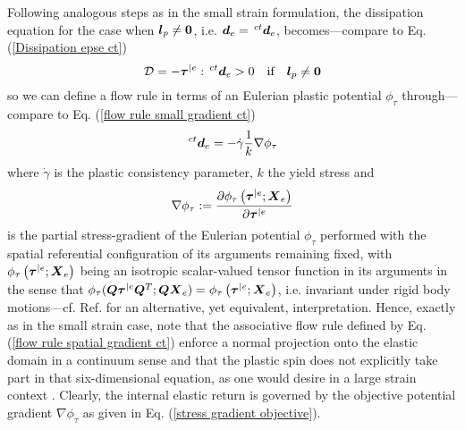 \documentclass[preprint,review,12pt,sort&compress]{elsarticle}%
\renewcommand{\mathbf}[1]{\mbox{\boldmath $#1$ \unboldmath}  \!\!}
\begin{document}
Following analogous steps as in the small strain formulation, the dissipation
equation for the case when $\mathbf{l}_{p}\neq\mathbf{0}$, i.e. $\mathbf{d}%
_{e}=\,^{ct}\mathbf{d}_{e}$, becomes---compare to Eq.
(\ref{Dissipation epse ct})%
\begin{equation}
\mathcal{D}=-\mathbf{\tau}^{|e}:\,^{ct}\mathbf{d}_{e}>0\quad\text{if}%
\quad\mathbf{l}_{p}\neq\mathbf{0} \label{Dissipation de ct}%
\end{equation}
so we can define a flow rule in terms of an Eulerian plastic potential
$\phi_{\tau}$ through---compare to Eq. (\ref{flow rule small gradient ct})%
\begin{equation}
\,^{ct}\mathbf{d}_{e}=-\dot{\gamma}\frac{1}{k}\nabla\phi_{\tau}
\label{flow rule spatial gradient ct}%
\end{equation}
where $\dot{\gamma}$ is the plastic consistency parameter, $k$ the yield
stress and%
\begin{equation}
\nabla\phi_{\tau}:=\frac{\partial\phi_{\tau}\left(  \mathbf{\tau}%
^{|e};\mathbf{X}_{e}\right)  }{\partial\mathbf{\tau}^{|e}}
\label{stress gradient objective}%
\end{equation}
is the partial stress-gradient of the Eulerian potential $\phi_{\tau}$
performed with the spatial referential configuration of its arguments
remaining fixed, with $\phi_{\tau}\left(  \mathbf{\tau}^{|e};\mathbf{X}%
_{e}\right)  $ being an isotropic scalar-valued tensor function in its
arguments in the sense that $\phi_{\tau}(\mathbf{Q\tau}^{|e}\mathbf{Q}%
^{T};\mathbf{QX}_{e})=\phi_{\tau}\left(  \mathbf{\tau}^{|e};\mathbf{X}%
_{e}\right)  $, i.e. invariant under rigid body motions---cf. Ref.
\cite{MenzelSteinmann03} for an alternative, yet equivalent, interpretation.
Hence, exactly as in the small strain case, note that the associative flow
rule defined by Eq. (\ref{flow rule spatial gradient ct}) enforce a normal
projection onto the elastic domain in a continuum sense and that the plastic
spin does not explicitly take part in that six-dimensional equation, as one
would desire in a large strain context \cite{Lubliner86}. Clearly, the
internal elastic return is governed by the objective potential gradient
$\nabla\phi_{\tau}$ as given in Eq. (\ref{stress gradient objective}).
\end{document}
